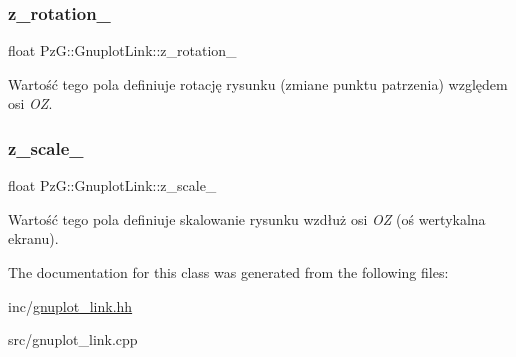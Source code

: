 \subsubsection{\texorpdfstring{z\+\_\+rotation\+\_\+}{z\_rotation\_}}
{\footnotesize\ttfamily float Pz\+G\+::\+Gnuplot\+Link\+::z\+\_\+rotation\+\_\+\hspace{0.3cm}{\ttfamily [protected]}}

Wartość tego pola definiuje rotację rysunku (zmiane punktu patrzenia) względem osi {\itshape OZ}. \mbox{\label{class_pz_g_1_1_gnuplot_link_a9926edcec6c7080a35f62c050f2773dc}} 
\subsubsection{\texorpdfstring{z\+\_\+scale\+\_\+}{z\_scale\_}}
{\footnotesize\ttfamily float Pz\+G\+::\+Gnuplot\+Link\+::z\+\_\+scale\+\_\+\hspace{0.3cm}{\ttfamily [protected]}}

Wartość tego pola definiuje skalowanie rysunku wzdłuż osi {\itshape OZ} (oś wertykalna ekranu). 

The documentation for this class was generated from the following files\+:\begin{DoxyCompactItemize}
\item 
inc/\hyperlink{gnuplot__link_8hh}{gnuplot\+\_\+link.\+hh}\item 
src/gnuplot\+\_\+link.\+cpp\end{DoxyCompactItemize}
